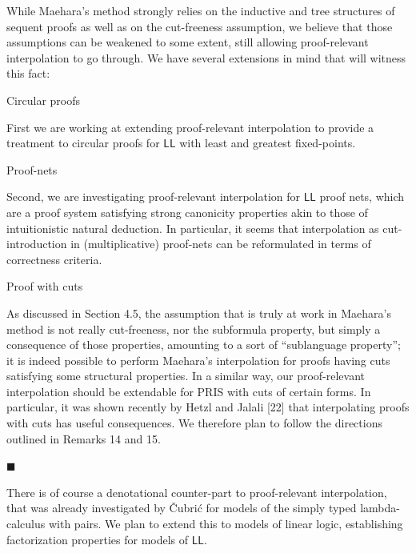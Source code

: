 While Maehara’s method strongly relies on the inductive and tree structures of sequent proofs as well as on the cut-freeness assumption, we believe that those assumptions can be weakened to some extent, still allowing proof-relevant interpolation to go through. We have several extensions in mind that will witness this fact:\par
  Circular proofs  
 
First we are working at extending proof-relevant interpolation to provide a treatment to circular proofs for $\mathsf{LL}$ with least and greatest fixed-points.\par
 
  Proof-nets  
 
Second, we are investigating proof-relevant interpolation for $\mathsf{LL}$ proof nets, which are a proof system satisfying strong canonicity properties akin to those of intuitionistic natural deduction. In particular, it seems that interpolation as cut-introduction in (multiplicative) proof-nets can be reformulated in terms of correctness criteria.\par
 
  Proof with cuts  
 
As discussed in Section 4.5, the assumption that is truly at work in Maehara’s method is not really cut-freeness, nor the subformula property, but simply a consequence of those properties, amounting to a sort of “sublanguage property”; it is indeed possible to perform Maehara’s interpolation for proofs having cuts satisfying some structural properties. In a similar way, our proof-relevant interpolation should be extendable for PRIS with cuts of certain forms. In particular, it was shown recently by Hetzl and Jalali [22] that interpolating proofs with cuts has useful consequences. We therefore plan to follow the directions outlined in Remarks 14 and 15.\par
 
   
 
 
\par\noindent  $\blacksquare$ 
 
There is of course a denotational counter-part to proof-relevant interpolation, that was already investigated by Čubrić for models of the simply typed lambda-calculus with pairs. We plan to extend this to models of linear logic, establishing factorization properties for models of $\mathsf{LL}$.\par
 
